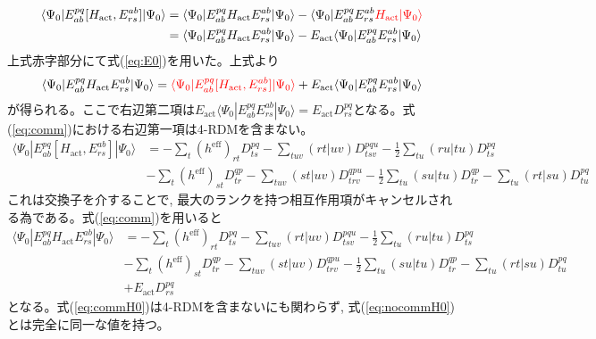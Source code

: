 \documentclass[11pt,pra,aps]{revtex4}
\newcommand{\red}[1]{\textcolor{red}{#1}}
\begin{document}
\begin{align}
  \langle\Psi_0|E^{pq}_{ab}[H_\text{act},E_{rs}^{ab}]|\Psi_0\rangle&=\langle\Psi_0|E^{pq}_{ab}H_\text{act}E_{rs}^{ab}|\Psi_0\rangle-\langle\Psi_0|E^{pq}_{ab}E_{rs}^{ab}\red{H_\text{act}|\Psi_0\rangle} \nonumber \\
  &=\langle\Psi_0|E^{pq}_{ab}H_\text{act}E_{rs}^{ab}|\Psi_0\rangle-E_\text{act}\langle\Psi_0|E^{pq}_{ab}E_{rs}^{ab}|\Psi_0\rangle
\end{align}
上式赤字部分にて式(\ref{eq:E0})を用いた。上式より
\begin{align}
  \langle\Psi_0|E^{pq}_{ab}H_\text{act}E_{rs}^{ab}|\Psi_0\rangle=\red{\langle\Psi_0|E^{pq}_{ab}[H_\text{act},E_{rs}^{ab}]|\Psi_0\rangle}+E_\text{act}\langle\Psi_0|E^{pq}_{ab}E_{rs}^{ab}|\Psi_0\rangle \label{eq:comm}
\end{align}
が得られる。ここで右辺第二項は$E_\text{act}\langle\Psi_0|E^{pq}_{ab}E_{rs}^{ab}|\Psi_0\rangle=E_\text{act}D^{pq}_{rs}$となる。式(\ref{eq:comm})における右辺第一項は4-RDMを含まない。
\begin{align}
  \langle\Psi_0|E^{pq}_{ab}[H_\text{act},E_{rs}^{ab}]|\Psi_0\rangle &= - \sum_{t} (h^\text{eff})_{rt} D^{pq}_{ts} - \sum_{tuv} (rt|uv) D^{pqu}_{tsv} - \frac{1}{2} \sum_{tu} (ru|tu) D^{pq}_{ts} \nonumber \\
  &- \sum_{t} (h^\text{eff})_{st} D^{qp}_{tr} - \sum_{tuv} (st|uv) D^{qpu}_{trv} - \frac{1}{2} \sum_{tu} (su|tu) D^{qp}_{tr} - \sum_{tu} (rt|su) D^{pq}_{tu} \label{eq:comm-wick}
\end{align}
これは交換子を介することで, 最大のランクを持つ相互作用項がキャンセルされる為である。式(\ref{eq:comm})を用いると
\begin{align}
  \langle\Psi_0|E^{pq}_{ab}H_\text{act}E_{rs}^{ab}|\Psi_0\rangle &= - \sum_{t} (h^\text{eff})_{rt} D^{pq}_{ts} - \sum_{tuv} (rt|uv) D^{pqu}_{tsv} - \frac{1}{2} \sum_{tu} (ru|tu) D^{pq}_{ts} \nonumber \\
  &- \sum_{t} (h^\text{eff})_{st} D^{qp}_{tr} - \sum_{tuv} (st|uv) D^{qpu}_{trv} - \frac{1}{2} \sum_{tu} (su|tu) D^{qp}_{tr} - \sum_{tu} (rt|su) D^{pq}_{tu} \nonumber \\
  &+E_\text{act}D^{pq}_{rs} \label{eq:commH0}
\end{align}
となる。式(\ref{eq:commH0})は4-RDMを含まないにも関わらず, 式(\ref{eq:nocommH0})とは完全に同一な値を持つ。
\end{document}
